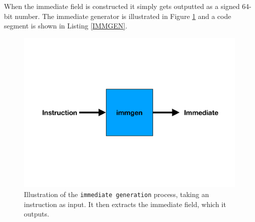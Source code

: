         When the immediate field is constructed it simply gets outputted as a signed 64-bit number. The immediate generator is illustrated in Figure \ref{fig:IMMGEN} and a code segment is shown in Listing \ref{IMMGEN}.
        
        
        \begin{figure}[h!]
            \centering
            \includegraphics[scale=0.35]{pictures/IMMGEN.pdf}
            \caption{Illustration of the \texttt{immediate generation} process, taking an instruction as input. It then extracts the immediate field, which it outputs. }
            \label{fig:IMMGEN}
        \end{figure}
    

